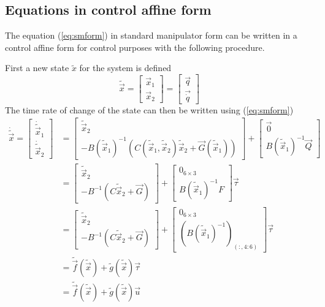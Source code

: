 \subsection{Equations in control affine form}
The equation (\ref{eq:smform}) in standard manipulator form can be written in a control affine
form for control purposes with the following procedure.
\par
First a new state $\tilde{x}$ for the system is defined
\[
\tilde{\vec{x}} =
\begin{bmatrix}
  \vec{x}_1 \\
  \vec{x}_2
\end{bmatrix} = 
\begin{bmatrix}
  \vec{q} \\
  \vec{\dot{q}}
\end{bmatrix}
\]
The time rate of change of the state can then be written using (\ref{eq:smform})
\begin{equation}\label{eq:nl_eq_1}
  \begin{split}
    \dot{\tilde{\vec{x}}} =
    \begin{bmatrix}
      \dot{\tilde{\vec{x}}}_1 \\
      \dot{\tilde{\vec{x}}}_2
    \end{bmatrix} &= 
    \begin{bmatrix}
      \tilde{\vec{x}}_2 \\
      - B({\tilde{\vec{x}}_1}) ^ {-1} (C(\tilde{\vec{x}}_1, \tilde{\vec{x}}_2) \tilde{\vec{x}}_2 + \vec{G}(\tilde{\vec{x}}_1)) 
    \end{bmatrix} +
    \begin{bmatrix}
      \vec{0} \\
      B({\tilde{\vec{x}}_1}) ^ {-1} \vec{Q}
    \end{bmatrix}\\
    &=\begin{bmatrix}
    \tilde{\vec{x}}_2 \\
    - B^ {-1} (C \tilde{\vec{x}}_2 + \vec{G}) 
    \end{bmatrix} +
    \begin{bmatrix}
      0_{6\times3} \\
      B({\tilde{\vec{x}}_1}) ^ {-1} F
    \end{bmatrix}\vec{\tau}\\
        &=\begin{bmatrix}
    \tilde{\vec{x}}_2 \\
    - B^ {-1} (C \tilde{\vec{x}}_2 + \vec{G}) 
    \end{bmatrix} +
    \begin{bmatrix}
      0_{6\times3} \\
      \left(B({\tilde{\vec{x}}_1}) ^ {-1}\right)_{(:, 4:6)}
    \end{bmatrix}\vec{\tau}\\
    &= \tilde{\vec{f}}(\tilde{\vec{x}}) + \tilde{g}(\tilde{\vec{x}}) \vec{\tau}\\
    &= \tilde{\vec{f}}(\tilde{\vec{x}}) + \tilde{g}(\tilde{\vec{x}}) \vec{u}
  \end{split}
\end{equation}
